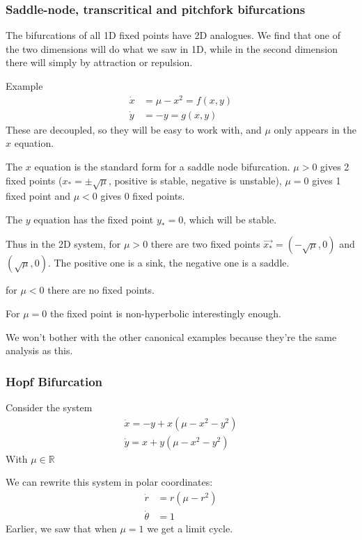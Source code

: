 \documentclass{/home/janmebows/Documents/LatexTemplates/myassignment}
\begin{document}
\subsubsection{Saddle-node, transcritical and pitchfork bifurcations}
The bifurcations of all 1D fixed points have 2D analogues. We find that one of the two dimensions will do what we saw in 1D, while in the second dimension there will simply by attraction or repulsion.

Example
\begin{align*}
    \dot x &= \mu - x^2 = f(x,y)\\
    \dot y &= - y = g(x,y)
\end{align*}
These are decoupled, so they will be easy to work with, and $\mu$ only appears in the $x$ equation.

The $x$ equation is the standard form for a saddle node bifurcation. $\mu > 0$ gives 2 fixed points ($x_*=\pm\sqrt{\mu}$, positive is stable, negative is unstable), $\mu = 0$ gives 1 fixed point and $\mu <0$ gives 0 fixed points.

The $y$ equation has the fixed point $y_*=0$, which will be stable.

Thus in the 2D system, for $\mu>0$ there are two fixed points $\vec{x_*} = \left(-\sqrt{\mu},0\right)$ and $\left(\sqrt{\mu},0\right)$. The positive one is a sink, the negative one is a saddle.

for $\mu <0$ there are no fixed points.

For $\mu=0$ the fixed point is non-hyperbolic interestingly enough.


We won't bother with the other canonical examples because they're the same analysis as this.


\subsubsection{Hopf Bifurcation}
Consider the system
\begin{align*}
    \dot x = -y + x(\mu - x^2 - y^2)\\
    \dot y = x + y(\mu-x^2-y^2)
\end{align*}
With $\mu \in \mathbb{R}$

We can rewrite this system in polar coordinates:
\begin{align*}
    \dot r &= r(\mu - r^2)\\
    \dot\theta &= 1
\end{align*}
Earlier, we saw that when $\mu=1$ we get a limit cycle. 
\end{document}
